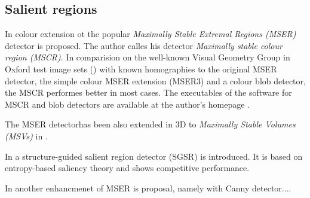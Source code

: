 \subsection{Salient regions}

In \cite{Forssen07} colour extension ot the popular {\em  Maximally Stable Extremal Regions (MSER)} detector is proposed. The author calles his detector {\em Maximally stable colour region (MSCR)}. In comparision on the well-known Visual Geometry Group in Oxford test image sets (\cite{vgg_soft_data}) with known homographies to the original MSER detector, the simple colour MSER extension (MSER3) and a colour blob detector, the MSCR performes better in most cases. The executables of the software for MSCR and blob detectors are available at the author's homepage \cite{forssen07_soft}.

The MSER detectorhas been also extended in 3D to {\em Maximally Stable Volumes (MSVs)} in \cite{DonoserB06}.

In \cite{Fan08} a structure-guided salient region detector (SGSR) is introduced. It is based on entropy-based saliency theory and shows competitive performance.

In \cite{Wang14} another enhancmenet of MSER is proposal, namely with Canny detector....